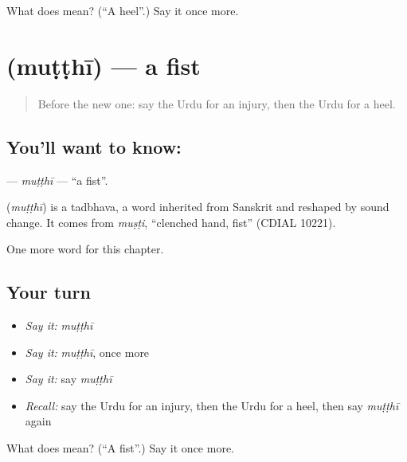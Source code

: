 \begin{tcolorbox}[breakable,colback=teal!4,colframe=teal!35!black,title={Before you move on}]
What does  mean? (\textquotedblleft{}A heel\textquotedblright{}.) Say it once more.
\end{tcolorbox}
\section[\texorpdfstring{\ur{مٹھی} (muṭṭhī)}{مٹھی (muṭṭhī)}]{ (muṭṭhī) — a fist}

\label{lesson:UR-C186-mutthi}



\begin{quote}
Before the new one: say the Urdu for an injury, then the Urdu for a heel.
\end{quote}

\subsection*{You'll want to know: }
\textbf{} — \emph{muṭṭhī} — \textquotedblleft{}a fist\textquotedblright{}.

\begin{cousinweb}
\textbf{} (\emph{muṭṭhī}) is a tadbhava, a word inherited from Sanskrit and reshaped by sound change. It comes from \emph{muṣṭi}, \textquotedblleft{}clenched hand, fist\textquotedblright{} (CDIAL 10221).
\end{cousinweb}

\begin{grammarlens}[title={What you've built}]
One more word for this chapter.
\end{grammarlens}

\subsection*{Your turn}
\begin{itemize}
\raggedright
  \item \emph{Say it:} \emph{muṭṭhī}
  \item \emph{Say it:} \emph{muṭṭhī}, once more
  \item \emph{Say it:} say \emph{muṭṭhī}
  \item \emph{Recall:} say the Urdu for an injury, then the Urdu for a heel, then say \emph{muṭṭhī} again
\end{itemize}

\begin{tcolorbox}[breakable,colback=teal!4,colframe=teal!35!black,title={Before you move on}]
What does  mean? (\textquotedblleft{}A fist\textquotedblright{}.) Say it once more.
\end{tcolorbox}
